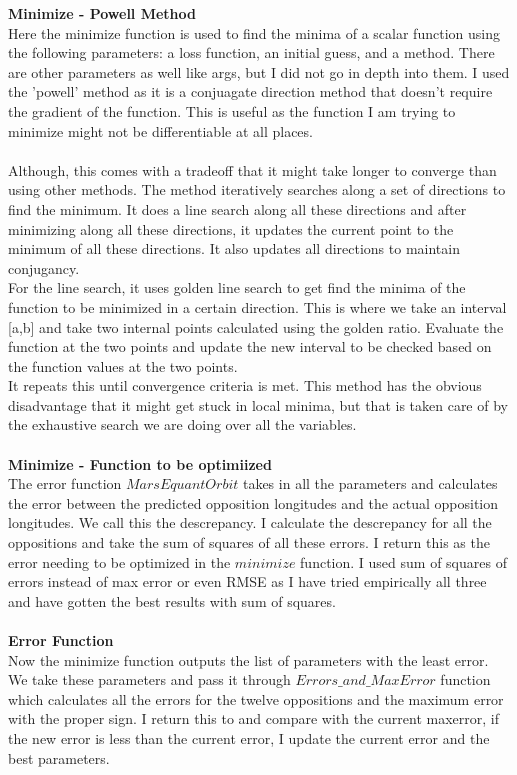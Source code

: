 \documentclass[12pt]{article}
\begin{document}
\textbf{Minimize - Powell Method}\\
Here the minimize function is used to find the minima of a scalar function using the following parameters: a loss function, an initial guess, and a method. There are other parameters as well like args, but I did not go in depth into them. I used the 'powell' method as it is a conjuagate direction method that doesn't require the gradient of the function. This is useful as the function I am trying to minimize might not be differentiable at all places. \\ \\
Although, this comes with a tradeoff that it might take longer to converge than using other methods. The method iteratively searches along a set of directions to find the minimum. It does a line search along all these directions and after minimizing along all these directions, it updates the current point to the minimum of all these directions. It also updates all directions to maintain conjugancy. \\ For the line search, it uses golden line search to get find the minima of the function to be minimized in a certain direction. This is where we take an interval [a,b] and take two internal points calculated using the golden ratio. Evaluate the function at the two points and update the new interval to be checked based on the function values at the two points.  \\ 
It repeats this until convergence criteria is met. This method has the obvious disadvantage that it might get stuck in local minima, but that is taken care of by the exhaustive search we are doing over all the variables.\\ \\
\textbf{Minimize - Function to be optimiized}\\
The error function $MarsEquantOrbit$ takes in all the parameters and calculates the error between the predicted opposition longitudes and the actual opposition longitudes. We call this the descrepancy. I calculate the descrepancy for all the oppositions and take the sum of squares of all these errors. I return this as the error needing to be optimized in the $minimize$ function. I used sum of squares of errors instead of max error or even RMSE as I have tried empirically all three and have gotten the best results with sum of squares.\\ \\
\textbf{Error Function}\\
Now the minimize function outputs the list of parameters with the least error. We take these parameters and pass it through $Errors\_and\_MaxError$ function which calculates all the errors for the twelve oppositions and the maximum error with the proper sign. I return this to and compare with the current maxerror, if the new error is less than the current error, I update the current error and the best parameters.\\ \\
\end{document}
